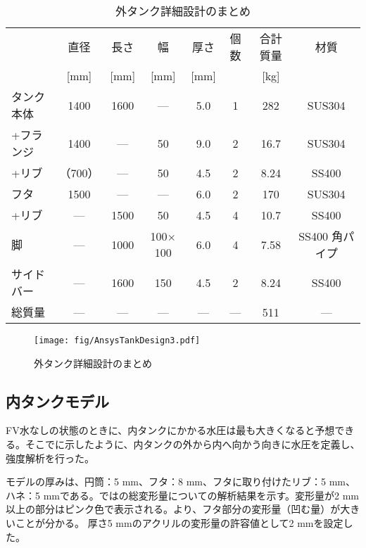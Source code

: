 \begin{table}[!h]
\caption[外タンク詳細設計のまとめ]{外タンク詳細設計のまとめ}
\begin{center}
\begin{tabular}{lccccccc}
\hline \hline
& 直径 & 長さ & 幅 & 厚さ & 個数 & 合計質量 & 材質 \\
& [mm] & [mm] & [mm] & [mm] &  & [kg] &  \\
\hline
タンク本体 & 1400 & 1600 & --- & 5.0 & 1 & 282 &  SUS304\\
+フランジ & 1400 & --- & 50 & 9.0 & 2 & 16.7 & SUS304\\
+リブ & （700）& --- & 50 & 4.5 & 2 & 8.24 &SS400\\
\hline
フタ & 1500 & --- & --- & 6.0 & 2 & 170 & SUS304 \\
+リブ & --- & 1500 & 50 & 4.5 & 4 & 10.7& SS400\\
\hline
脚 & --- & 1000 & 100$\times$100 & 6.0 & 4 & 7.58 & SS400 角パイプ\\
サイドバー & --- & 1600 & 150 & 4.5 & 2 & 8.24 & SS400\\
\hline
総質量 & --- & --- & --- & --- & --- & 511 & ---\\
\hline \hline
\end{tabular}
\end{center}
\label{TableAnsysTankDesign}
\end{table}%

\begin{figure}[!h]
\centering
\texttt{[image: fig/AnsysTankDesign3.pdf]}
\caption[外タンク詳細設計のまとめ]{外タンク詳細設計のまとめ}
\label{AnsysTankDesign}
\end{figure}

\subsection{内タンクモデル}
FV水なしの状態のときに、内タンクにかかる水圧は最も大きくなると予想できる。そこでに示したように、内タンクの外から内へ向かう向きに水圧を定義し、強度解析を行った。

モデルの厚みは、円筒：5 mm、フタ：8 mm、フタに取り付けたリブ：5 mm、ハネ：5 mmである。ではの総変形量についての解析結果を示す。変形量が2 mm以上の部分はピンク色で表示される。より、フタ部分の変形量（凹む量）が大きいことが分かる。
厚さ5 mmのアクリルの変形量の許容値として2 mmを設定した。


